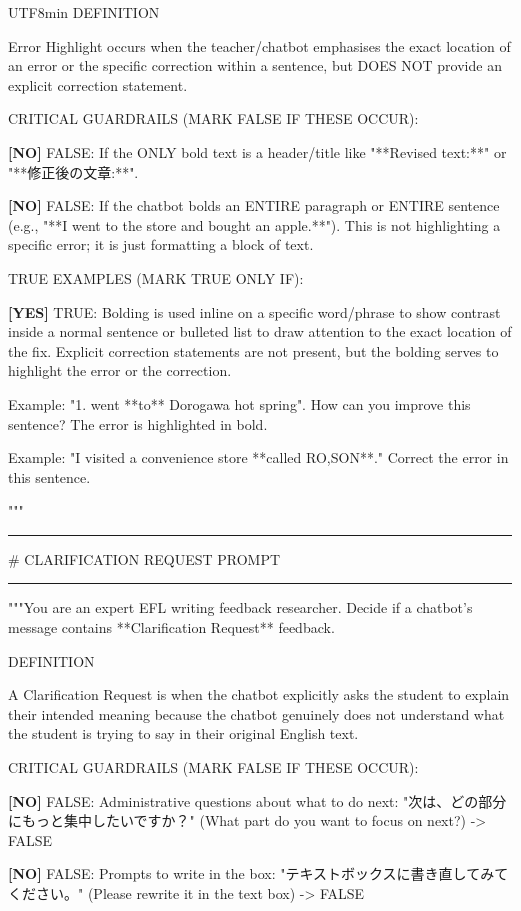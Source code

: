 \begin{CJK}{UTF8}{min}
DEFINITION

Error Highlight occurs when the teacher/chatbot emphasises the exact location of an error or the specific correction within a sentence, but DOES NOT provide an explicit correction statement.

CRITICAL GUARDRAILS (MARK FALSE IF THESE OCCUR):

\textbf{[NO]} FALSE: If the ONLY bold text is a header/title like "**Revised text:**" or "**修正後の文章:**".

\textbf{[NO]} FALSE: If the chatbot bolds an ENTIRE paragraph or ENTIRE sentence (e.g., "**I went to the store and bought an apple.**"). This is not highlighting a specific error; it is just formatting a block of text.

TRUE EXAMPLES (MARK TRUE ONLY IF):

\textbf{[YES]} TRUE: Bolding is used inline on a specific word/phrase to show contrast inside a normal sentence or bulleted list to draw attention to the exact location of the fix. Explicit correction statements are not present, but the bolding serves to highlight the error or the correction.

Example: "1. went **to** Dorogawa hot spring". How can you improve this sentence? The error is highlighted in bold.

Example: "I visited a convenience store **called RO,SON**." Correct the error in this sentence.

"""

\medskip\hrule\medskip

\# CLARIFICATION REQUEST PROMPT

\medskip\hrule\medskip

"""You are an expert EFL writing feedback researcher. Decide if a chatbot's message contains **Clarification Request** feedback.

DEFINITION

A Clarification Request is when the chatbot explicitly asks the student to explain their intended meaning because the chatbot genuinely does not understand what the student is trying to say in their original English text.

CRITICAL GUARDRAILS (MARK FALSE IF THESE OCCUR):

\textbf{[NO]} FALSE: Administrative questions about what to do next: "次は、どの部分にもっと集中したいですか？" (What part do you want to focus on next?) -\textgreater{} FALSE

\textbf{[NO]} FALSE: Prompts to write in the box: "テキストボックスに書き直してみてください。" (Please rewrite it in the text box) -\textgreater{} FALSE


\end{CJK}
